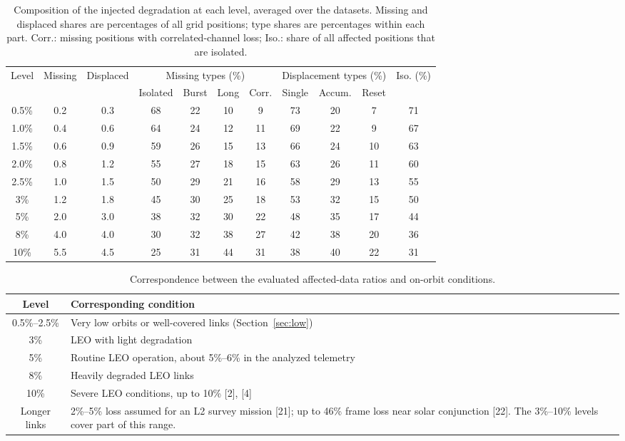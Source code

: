 \documentclass[10pt,a4paper]{article}
\begin{document}
\begin{table}[!htbp]
\centering
\caption{Composition of the injected degradation at each level, averaged over the datasets. Missing and displaced shares are percentages of all grid positions; type shares are percentages within each part. Corr.: missing positions with correlated-channel loss; Iso.: share of all affected positions that are isolated.}
\label{tab:s2}
\small
\setlength{\tabcolsep}{4.5pt}
\begin{tabular}{ccccccccccc}
\toprule
\multirow{2}{*}{Level} & \multirow{2}{*}{Missing} & \multirow{2}{*}{Displaced} & \multicolumn{4}{c}{Missing types (\%)} & \multicolumn{3}{c}{Displacement types (\%)} & \multirow{2}{*}{Iso. (\%)} \\
\cmidrule(lr){4-7}\cmidrule(lr){8-10}
& & & Isolated & Burst & Long & Corr. & Single & Accum. & Reset & \\
\midrule
0.5\% & 0.2 & 0.3 & 68 & 22 & 10 & 9 & 73 & 20 & 7 & 71 \\
1.0\% & 0.4 & 0.6 & 64 & 24 & 12 & 11 & 69 & 22 & 9 & 67 \\
1.5\% & 0.6 & 0.9 & 59 & 26 & 15 & 13 & 66 & 24 & 10 & 63 \\
2.0\% & 0.8 & 1.2 & 55 & 27 & 18 & 15 & 63 & 26 & 11 & 60 \\
2.5\% & 1.0 & 1.5 & 50 & 29 & 21 & 16 & 58 & 29 & 13 & 55 \\
3\% & 1.2 & 1.8 & 45 & 30 & 25 & 18 & 53 & 32 & 15 & 50 \\
5\% & 2.0 & 3.0 & 38 & 32 & 30 & 22 & 48 & 35 & 17 & 44 \\
8\% & 4.0 & 4.0 & 30 & 32 & 38 & 27 & 42 & 38 & 20 & 36 \\
10\% & 5.5 & 4.5 & 25 & 31 & 44 & 31 & 38 & 40 & 22 & 31 \\
\bottomrule
\end{tabular}
\end{table}

\begin{table}[!htbp]
\centering
\caption{Correspondence between the evaluated affected-data ratios and on-orbit conditions.}
\label{tab:s3}
\small
\begin{tabularx}{0.88\linewidth}{c X}
\toprule
Level & Corresponding condition \\
\midrule
0.5\%--2.5\% & Very low orbits or well-covered links (Section~\ref{sec:low}) \\
3\% & LEO with light degradation \\
5\% & Routine LEO operation, about 5\%--6\% in the analyzed telemetry \\
8\% & Heavily degraded LEO links \\
10\% & Severe LEO conditions, up to 10\% [2], [4] \\
\midrule
Longer links & 2\%--5\% loss assumed for an L2 survey mission [21]; up to 46\% frame loss near solar conjunction [22]. The 3\%--10\% levels cover part of this range. \\
\bottomrule
\end{tabularx}
\end{table}
\end{document}
